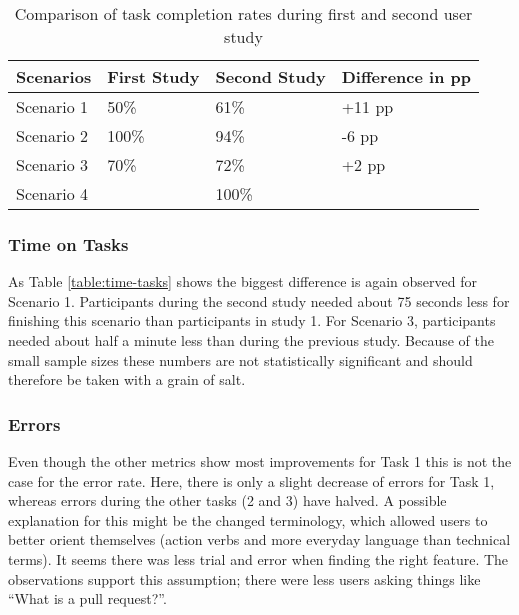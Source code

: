 \begin{table}[h!]
\centering
\begin{tabular}{|l|l|l|l|}
\hline
\rowcolor[HTML]{EFEFEF}
{\bf Scenarios} & {\bf First Study} & {\bf Second Study} & {\bf Difference in pp} \\ \hline
Scenario 1 & 50\% & 61\% & +11 pp \\ \hline
Scenario 2 & 100\% & 94\% & -6 pp \\ \hline
Scenario 3 & 70\% & 72\% & +2 pp \\ \hline
Scenario 4 &  & 100\% &  \\ \hline
\end{tabular}
\caption{Comparison of task completion rates during first and second user study}
\label{table:task-compl}
\end{table}

\subsubsection{Time on Tasks}
As Table \ref{table:time-tasks} shows the biggest difference is again observed for Scenario 1. Participants during the second study needed about 75 seconds less for finishing this scenario than participants in study 1. For Scenario 3, participants needed about half a minute less than during the previous study. Because of the small sample sizes these numbers are not statistically significant and should therefore be taken with a grain of salt.

\begin{table}[h!]
\centering
{}
\caption{Time on tasks (in seconds)}
\label{table:time-tasks}
\end{table}

\subsubsection{Errors}
Even though the other metrics show most improvements for Task 1 this is not the case for the error rate. Here, there is only a slight decrease of errors for Task 1, whereas errors during the other tasks (2 and 3) have halved. A possible explanation for this might be the changed terminology, which allowed users to better orient themselves (action verbs and more everyday language than technical terms). It seems there was less trial and error when finding the right feature. The observations support this assumption; there were less users asking things like “What is a pull request?”.

